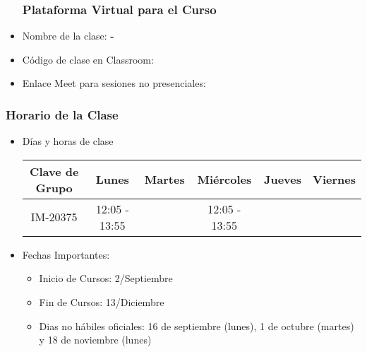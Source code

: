 
\begin{frame}
\begin{itemize}
\frametitle{Plataforma Virtual para el Curso}
\item Nombre de la clase: \textbf{\nombreMateria-\cuatrimestre}
\item Código de clase en Classroom: \textbf{\claveClassroom}
\item Enlace Meet para sesiones no presenciales: \textbf{\claveMeet}
\end{itemize}
\end{frame}

\begin{frame}
\frametitle{Horario de la Clase}


\begin{itemize}
\item Días y horas de clase
\tiny
\begin{spacing}{1.0}
\begin{center}
\begin{tabular}{c|ccccc}
\hline 
\textbf{Clave de Grupo}          & Lunes           & Martes       & Miércoles      & Jueves          & Viernes        \\  \hline 
IM-20375  & 12:05 - 13:55   &              & 12:05 - 13:55  &                 &                \\
\hline
\end{tabular}
\end{center}
\end{spacing}
\normalsize
\item Fechas Importantes:
\begin{itemize}
\item Inicio de Cursos: 2/Septiembre
\item Fin de Cursos: 13/Diciembre
\item Dias no hábiles oficiales: 16 de septiembre (lunes), 1 de octubre (martes) y 18 de noviembre (lunes) 
\end{itemize}
\end{itemize}

\end{frame}


